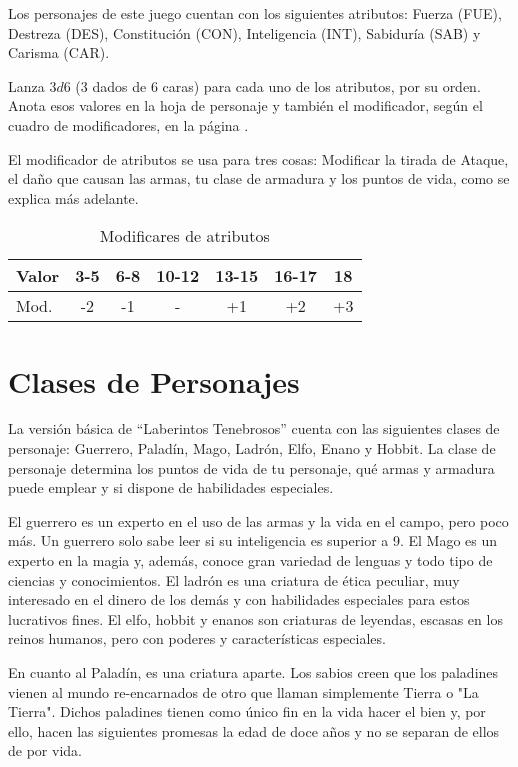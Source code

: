\begin{multicols}{2}
Los personajes de este juego cuentan con los siguientes atributos: Fuerza (FUE),
Destreza (DES), Constitución (CON), Inteligencia (INT), Sabiduría (SAB) y
Carisma (CAR).

Lanza $3d6$ (3 dados de 6 caras) para cada uno de los atributos, por su orden.
Anota esos valores en la hoja de personaje y también el modificador, según el
cuadro de modificadores, en la página \pageref{c_mods_atributos}.

El modificador de atributos se usa para tres cosas: Modificar la tirada de Ataque,
el daño que causan las armas, tu clase de armadura y los puntos de vida, como se
explica más adelante.

\begin{table*}[p]
\centering
\label{c_mods_atributos}
\caption{Modificares de atributos}
\begin{tabular}{lcccccc}
\toprule
Valor       &  3-5  &  6-8 & 10-12 & 13-15 & 16-17 & 18\\
\midrule
Mod. &  -2   &  -1  &  -    &  +1   &  +2   & +3\\
\bottomrule
\end{tabular}
\end{table*}

\section{Clases de Personajes}

La versión básica de \enquote{Laberintos Tenebrosos} cuenta con las siguientes
clases de personaje: Guerrero, Paladín, Mago, Ladrón, Elfo, Enano y Hobbit. La clase de
personaje determina los puntos de vida de tu personaje, qué armas y armadura
puede emplear y si dispone de habilidades especiales.

El guerrero es un experto en el uso de las armas y la vida en el campo, pero
poco más. Un guerrero solo sabe leer si su inteligencia es superior a 9. El Mago
es un experto en la magia y, además, conoce gran variedad de lenguas y todo tipo
de ciencias y conocimientos. El ladrón es una criatura de ética peculiar, muy
interesado en el dinero de los demás y con habilidades especiales para estos
lucrativos fines. El elfo, hobbit y enanos son criaturas de leyendas, escasas en
los reinos humanos, pero con poderes y características especiales.

En cuanto al Paladín, es una criatura aparte. Los sabios creen que los paladines
vienen al mundo re-encarnados de otro que llaman simplemente Tierra o "La Tierra".
Dichos paladines tienen como único fin en la vida hacer el bien y, por ello, hacen
las siguientes promesas la edad de doce años y no se separan de ellos de por vida.


\end{multicols}
